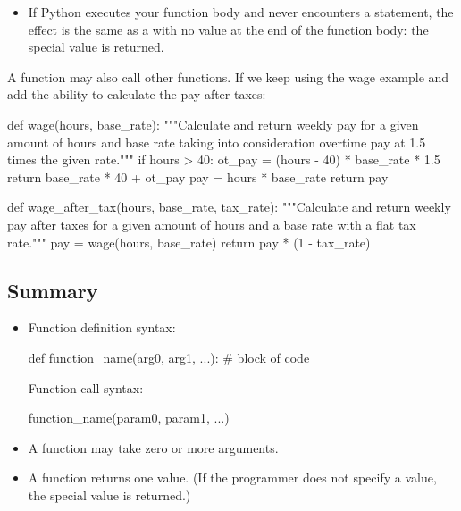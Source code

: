 \documentclass[11pt]{cselabheader}
\begin{document}
{\begin{itemize}
  \item If Python executes your function body and never encounters a
     statement, the effect is the same as a
     with no value at the end of the function body: the
    special value  is returned.
\end{itemize}

A function may also call other functions. If we keep using the wage example and
add the ability to calculate the pay after taxes:

\begin{python3code}
def wage(hours, base_rate):
    """Calculate and return weekly pay for a given amount of hours and base rate taking
    into consideration overtime pay at 1.5 times the given rate."""
    if hours > 40:
        ot_pay = (hours - 40) * base_rate * 1.5
        return base_rate * 40 + ot_pay
    pay = hours * base_rate
    return pay

def wage_after_tax(hours, base_rate, tax_rate):
    """Calculate and return weekly pay after taxes for a given amount of hours and a 
    base rate with a flat tax rate."""
    pay = wage(hours, base_rate)
    return pay * (1 - tax_rate)
\end{python3code}

\subsection{Summary}
\label{subsec:funcs.sum}

\begin{itemize}
  \item Function definition syntax:

    \begin{python3code}
def function_name(arg0, arg1, ...):
    # block of code
    \end{python3code}

    Function call syntax:

    \begin{python3code}
function_name(param0, param1, ...)
    \end{python3code}

  \item A function may take zero or more arguments.

  \item A function returns one value. (If the programmer does not specify a
    value, the special value  is returned.)


\end{itemize}}
\end{document}
